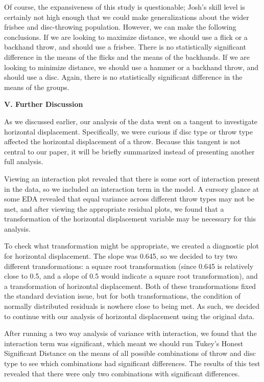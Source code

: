 \documentclass[letter,12pt]{article}
\begin{document}
  Of course, the expansiveness of this study is questionable; Josh’s skill level is certainly not high enough that we could make generalizations about the wider frisbee and disc-throwing population. However, we can make the following conclusions. If we are looking to maximize distance, we should use a flick or a backhand throw, and should use a frisbee. There is no statistically significant difference in the means of the flicks and the means of the backhands. If we are looking to minimize distance, we should use a hammer or a backhand throw, and should use a disc. Again, there is no statistically significant difference in the means of the groups.\par
	
	\begin{center}
		\textbf{V. Further Discussion}\par
	\end{center}
	\justify
	As we discussed earlier, our analysis of the data went on a tangent to investigate horizontal displacement. Specifically, we were curious if disc type or throw type affected the horizontal displacement of a throw. Because this tangent is not central to our paper, it will be briefly summarized instead of presenting another full analysis.\par
	Viewing an interaction plot revealed that there is some sort of interaction present in the data, so we included an interaction term in the model. A cursory glance at some EDA revealed that equal variance across different throw types may not be met, and after viewing the appropriate residual plots, we found that a transformation of the horizontal displacement variable may be necessary for this analysis.\par
	To check what transformation might be appropriate, we created a diagnostic plot for horizontal displacement. The slope was 0.645, so we decided to try two different transformations: a square root transformation (since 0.645 is relatively close to 0.5, and a slope of 0.5 would indicate a square root transformation), and a transformation of horizontal displacement. Both of these transformations fixed the standard deviation issue, but for both transformations, the condition of normally distributed residuals is nowhere close to being met. As such, we decided to continue with our analysis of horizontal displacement using the original data. \par
	After running a two way analysis of variance with interaction, we found that the interaction term was significant, which meant we should run Tukey’s Honest Significant Distance on the means of all possible combinations of throw and disc type to see which combinations had significant differences. The results of this test revealed that there were only two combinations with significant differences.\par
\end{document}
